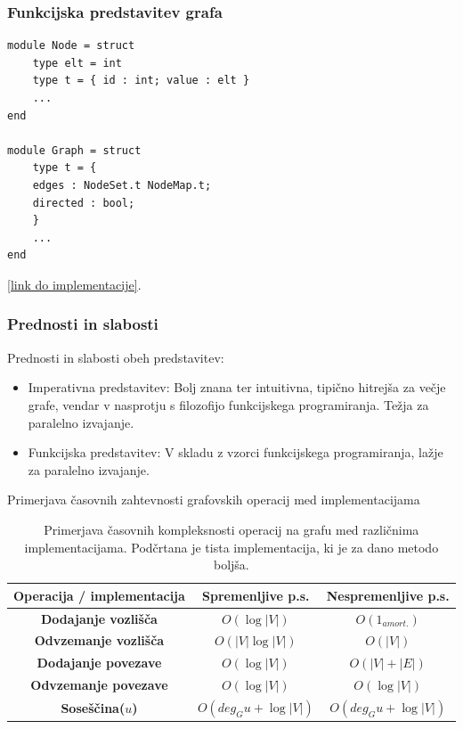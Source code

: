 \documentclass{beamer}
\begin{document}
\begin{frame}[fragile]
    \frametitle{Funkcijska predstavitev grafa}
\begin{verbatim}
module Node = struct
    type elt = int
    type t = { id : int; value : elt }
    ...
end

module Graph = struct
    type t = {
    edges : NodeSet.t NodeMap.t;
    directed : bool;
    }
    ...
end
    \end{verbatim}
        
    \href{https://github.com/tjazerzen/parallelisation-of-graph-algorithms-in-functional-programming-languages/blob/master/playground/graph/graph.ml}{[link do implementacije]}.
\end{frame}

\begin{frame}
    \frametitle{Prednosti in slabosti}
    Prednosti in slabosti obeh predstavitev:
    \begin{itemize}
    \item Imperativna predstavitev: Bolj znana ter intuitivna, tipično hitrejša za večje grafe, vendar v nasprotju s filozofijo funkcijskega programiranja.
          Težja za paralelno izvajanje.
    \item Funkcijska predstavitev: V skladu z vzorci funkcijskega programiranja, lažje za paralelno izvajanje.
    \end{itemize}
\end{frame}

\begin{frame}{Primerjava časovnih zahtevnosti grafovskih operacij med implementacijama}

    \begin{table}
      \centering
      \footnotesize
      \begin{tabular}{|c|c|c|}
      \hline
      \textbf{Operacija / implementacija} & \textbf{Spremenljive p.s.} & \textbf{Nespremenljive p.s.} \\ \hline
      \textbf{Dodajanje vozlišča} & $O(\log |V|)$ & \underline{$O(1_{amort.})$} \\ \hline
      \textbf{Odvzemanje vozlišča} & $O(|V| \log |V|)$ & \underline{$O(|V|)$} \\ \hline
      \textbf{Dodajanje povezave} & \underline{$O(\log |V|)$} & $O(|V| + |E|)$ \\ \hline
      \textbf{Odvzemanje povezave} & \underline{$O(\log |V|)$} & \underline{$O(\log |V|)$} \\ \hline
      \textbf{Soseščina($u$)} & \underline{$O(deg_Gu + \log |V|)$} & \underline{$O(deg_Gu + \log |V|)$} \\ \hline
      \end{tabular}
      \caption{Primerjava časovnih kompleksnosti operacij na grafu med različnima implementacijama. Podčrtana je tista 
      implementacija, ki je za dano metodo boljša.}
      \label{tab:primerjava_casovnih_kompleksnosti_operacij_na_grafu_med_razlicnima_implementacijama}
    \end{table}
    
\end{frame}
    
\end{document}
